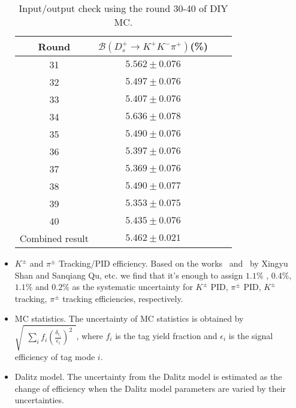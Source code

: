 \documentclass[aps,prd,twocolumn,showpacs,amsmath,amssymb]{revtex4-1}
\begin{document}
\begin{itemize}
        \begin{table}[htbp]
            \caption{Input/output check using the round 30-40 of DIY MC.}
            \label{BR-IO}
            \begin{center}
                \begin{tabular}{cccc}
                    \hline\hline
                    Round   &$\mathcal{B}(D_{s}^{+} \rightarrow K^{+}K^{-}\pi^{+})$(\%) \\
                    \hline
                    31                                  & $5.562 \pm 0.076$\\ 
                    32                                  & $5.497 \pm 0.076$\\
                    33                                  & $5.407 \pm 0.076$\\
                    34                                  & $5.636 \pm 0.078$\\
                    35                                  & $5.490 \pm 0.076$\\
                    36                                  & $5.397 \pm 0.076$\\
                    37                                  & $5.369 \pm 0.076$\\
                    38                                  & $5.490 \pm 0.077$\\
                    39                                  & $5.353 \pm 0.075$\\
                    40                                  & $5.435 \pm 0.076$\\
                    \hline
                    Combined result                               & $5.462 \pm 0.021$\\
                    \hline\hline
                \end{tabular}
            \end{center}
        \end{table}

    \item $K^{\pm}$ and $\pi^{\pm}$ Tracking/PID efficiency. Based on the works~\cite{PID} and~\cite{Tracking} by Xingyu Shan and Sanqiang Qu, etc. 
        we find that it's enough to assign $1.1\%$ , $0.4\%$, $1.1\%$ and $0.2\%$ as the systematic uncertainty for $K^{\pm}$ PID, $\pi^{\pm}$ PID,  $K^{\pm}$ tracking, $\pi^{\pm}$ tracking efficiencies, respectively.

\item MC statistics. The uncertainty of MC statistics is obtained by $\sqrt{ \begin{matrix} \sum_{i} f_{i}{(\frac{\delta_{\epsilon_{i}}}{\epsilon_{i}})}^{2}\end{matrix}}$, where $f_{i}$ is the tag yield fraction and $\epsilon_{i}$ is the signal efficiency of tag mode $i$.
    \item Dalitz model. The uncertainty from the Dalitz model is estimated as the change of efficiency when the Dalitz model parameters are varied by their uncertainties.
\end{itemize}
\end{document}
